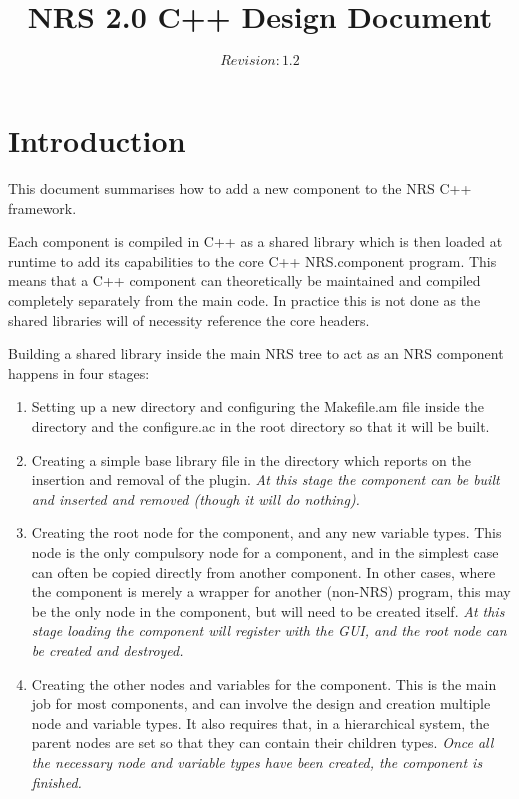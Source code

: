 \documentclass[pdftex,a4paper]{article}
\author{$Revision: 1.2 $}
\title{NRS 2.0 C++ Design Document}
\begin{document}
\date{}
\maketitle

\tableofcontents

\pagebreak

\section{Introduction}

This document summarises how to add a new component to the NRS C++
framework.

Each component is compiled in C++ as a shared library which is then
loaded at runtime to add its capabilities to the core C++
NRS.component program. This means that a C++ component can
theoretically be maintained and compiled completely separately from
the main code. In practice this is not done as the shared libraries
will of necessity reference the core headers.

Building a shared library inside the main NRS tree to act as an NRS
component happens in four stages:

\begin{enumerate}

\item Setting up a new directory and configuring the Makefile.am file
  inside the directory and the configure.ac in the root directory so
  that it will be built.

\item Creating a simple base library file in the directory which
  reports on the insertion and removal of the plugin. {\em At this
  stage the component can be built and inserted and removed (though it
  will do nothing).}

\item Creating the root node for the component, and any new variable
  types. This node is the only compulsory node for a component, and in
  the simplest case can often be copied directly from another
  component. In other cases, where the component is merely a wrapper
  for another (non-NRS) program, this may be the only node in the
  component, but will need to be created itself. {\em At this stage
  loading the component will register with the GUI, and the root node
  can be created and destroyed.}

\item Creating the other nodes and variables for the component. This
  is the main job for most components, and can involve the design and
  creation multiple node and variable types. It also requires that, in
  a hierarchical system, the parent nodes are set so that they can
  contain their children types. {\em Once all the necessary node and
  variable types have been created, the component is finished.}

\end{enumerate}
\end{document}
